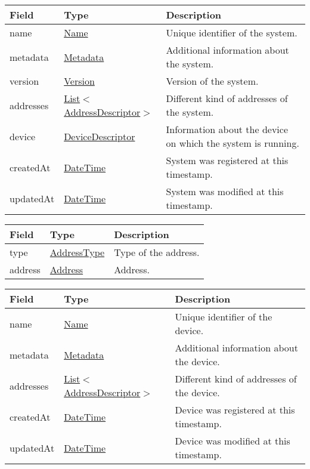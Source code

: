 \documentclass[a4paper]{arrowhead}
\newcommand{\pref}[1]{{\textcolor{ArrowheadGrey}{\hyperref[sec:model:primitives:#1]{#1}}}}
\begin{document}
\begin{table}[ht!]
\begin{tabularx}{\textwidth}{| p{3cm} | p{4cm} | X |} \hline
\rowcolor{gray!33} Field & Type      & Description \\ \hline
name & \pref{Name} & Unique identifier of the system. \\ \hline
metadata & \hyperref[sec:model:Metadata]{Metadata} & Additional information about the system. \\ \hline
version & \pref{Version} & Version of the system. \\ \hline
addresses &  \pref{List}$<$\hyperref[sec:model:AddressDescriptor]{AddressDescriptor}$>$ & Different kind of addresses of the system.  \\ \hline
device & \hyperref[sec:model:DeviceDescriptor]{DeviceDescriptor} & Information about the device on which the system is running. \\ \hline
createdAt & \pref{DateTime} & System was registered at this timestamp. \\ \hline
updatedAt & \pref{DateTime} & System was modified at this timestamp. \\ \hline
\end{tabularx}
\end{table}

\label{sec:model:AddressDescriptor}

\begin{table}[ht!]
\begin{tabularx}{\textwidth}{| p{3cm} | p{3.5cm} | X |} \hline
\rowcolor{gray!33} Field & Type      & Description \\ \hline
type & \pref{AddressType} & Type of the address. \\ \hline
address & \pref{Address} & Address. \\ \hline
\end{tabularx}
\end{table}

\clearpage

\label{sec:model:DeviceDescriptor}
 
\begin{table}[ht!]
\begin{tabularx}{\textwidth}{| p{3cm} | p{4cm} | X |} \hline
\rowcolor{gray!33} Field & Type & Description \\ \hline
name & \pref{Name} & Unique identifier of the device. \\ \hline
metadata & \hyperref[sec:model:Metadata]{Metadata} & Additional information about the device. \\ \hline
addresses &  \pref{List}$<$\hyperref[sec:model:AddressDescriptor]{AddressDescriptor}$>$ & Different kind of addresses of the device.  \\ \hline
createdAt & \pref{DateTime} & Device was registered at this timestamp. \\ \hline
updatedAt & \pref{DateTime} & Device was modified at this timestamp. \\ \hline
\end{tabularx}
\end{table}
\end{document}
